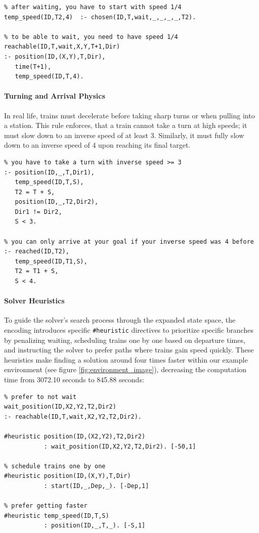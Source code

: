 \begin{verbatim}
% after waiting, you have to start with speed 1/4
temp_speed(ID,T2,4)  :- chosen(ID,T,wait,_,_,_,_,T2).

% to be able to wait, you need to have speed 1/4
reachable(ID,T,wait,X,Y,T+1,Dir)
:- position(ID,(X,Y),T,Dir),
   time(T+1),
   temp_speed(ID,T,4).
\end{verbatim}

\paragraph{Turning and Arrival Physics}
In real life, trains must decelerate before taking sharp turns or when pulling into a station. This rule enforces, that a train cannot take a turn at high speeds; it must slow down to an inverse speed of at least 3. Similarly, it must fully slow down to an inverse speed of 4 upon reaching its final target.
\begin{verbatim}
% you have to take a turn with inverse speed >= 3 
:- position(ID,_,T,Dir1),
   temp_speed(ID,T,S),
   T2 = T + S,
   position(ID,_,T2,Dir2),
   Dir1 != Dir2,
   S < 3.

% you can only arrive at your goal if your inverse speed was 4 before
:- reached(ID,T2),
   temp_speed(ID,T1,S),
   T2 = T1 + S,
   S < 4.
\end{verbatim}

\paragraph{Solver Heuristics}
To guide the solver's search process through the expanded state space, the encoding introduces specific \texttt{\#heuristic} directives to prioritize specific branches by penalizing waiting, scheduling trains one by one based on departure times, and instructing the solver to prefer paths where trains gain speed quickly. These heuristics make finding a solution around four times faster within our example environment (see figure \ref{fig:environment_image}), decreasing the computation time from 3072.10 seconds to 845.88 seconds:

\begin{verbatim}
% prefer to not wait
wait_position(ID,X2,Y2,T2,Dir2) 
:- reachable(ID,T,wait,X2,Y2,T2,Dir2).

#heuristic position(ID,(X2,Y2),T2,Dir2)
           : wait_position(ID,X2,Y2,T2,Dir2). [-50,1]

% schedule trains one by one
#heuristic position(ID,(X,Y),T,Dir)
           : start(ID,_,Dep,_). [-Dep,1]

% prefer getting faster
#heuristic temp_speed(ID,T,S)
           : position(ID,_,T,_). [-S,1]
\end{verbatim}

